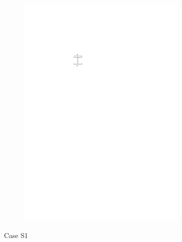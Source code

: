 \begin{description}
\begin{itemize}
\begin{figure}[H]
			\centering
			\begin{subfigure}{0.4\linewidth}
				\centering
				\includegraphics[width=0.9\textwidth,page=5]{drawings/2-trees.pdf}
			\end{subfigure}
			\caption{Case S1}\label{im:SP_CaseS1}
		\end{figure}
		\begin{figure}[H]
	\centering
	\begin{subfigure}{0.8\linewidth}
		\centering

\end{subfigure}
\end{figure}
\end{itemize}
\end{description}
